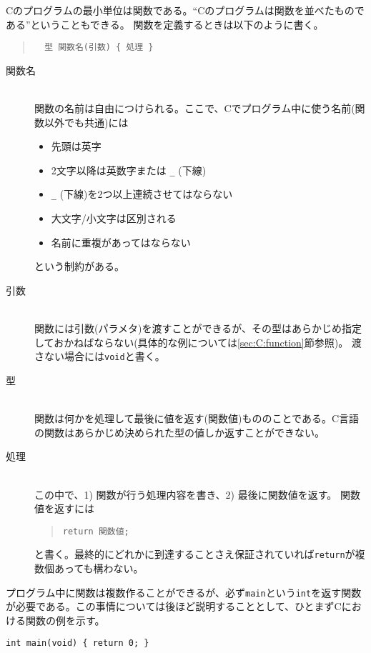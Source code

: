 Cのプログラムの最小単位は関数である。``Cのプログラムは関数を並べたものである''ということもできる。
関数を定義するときは以下のように書く。
\begin{quote}
    \begin{verbatim}
  型 関数名(引数) { 処理 }
  \end{verbatim}
\end{quote}
\begin{description}
    \item[関数名]\mbox{}\\
          関数の名前は自由につけられる。ここで、Cでプログラム中に使う名前(関数以外でも共通)には
          \begin{itemize}
              \item 先頭は英字
              \item 2文字以降は英数字または \texttt{\_} (下線)
              \item \texttt{\_} (下線)を2つ以上連続させてはならない
              \item 大文字/小文字は区別される
              \item 名前に重複があってはならない
          \end{itemize}
          という制約がある。
    \item[引数]\mbox{}\\
          関数には引数(パラメタ)を渡すことができるが、その型はあらかじめ指定しておかねばならない(具体的な例については\ref{sec:C:function}節参照)。
          渡さない場合には\texttt{void}と書く。
    \item[型]\mbox{}\\
          関数は何かを処理して最後に値を返す(関数値)もののことである。C言語の関数はあらかじめ決められた型の値しか返すことができない。
    \item[処理]\mbox{}\\
          この中で、1) 関数が行う処理内容を書き、2) 最後に関数値を返す。
          関数値を返すには
          \begin{quote}
\begin{verbatim}
return 関数値;
\end{verbatim}
          \end{quote}
          と書く。最終的にどれかに到達することさえ保証されていれば\texttt{return}が複数個あっても構わない。
\end{description}
プログラム中に関数は複数作ることができるが、必ず\texttt{main}という\texttt{int}を返す関数が必要である。この事情については後ほど説明することとして、ひとまずCにおける関数の例を示す。
\begin{reidai}\label{ex:hinagata1}
    \begin{verbatim}
int main(void) { return 0; }
\end{verbatim}
\end{reidai}

